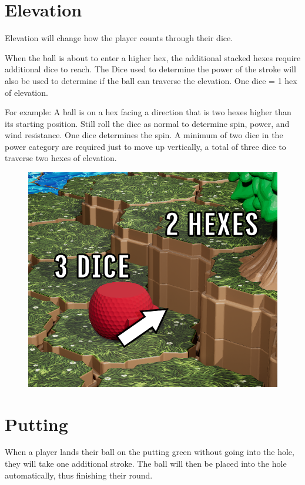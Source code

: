 \documentclass[../main.tex]{subfiles}
\begin{document}
\section{Elevation}
Elevation will change how the player counts through their dice.

When the ball is about to enter a higher hex, the additional stacked hexes require additional dice to reach. The Dice used to determine the power of the stroke will also be used to determine if the ball can traverse the elevation. One dice  = 1 hex of elevation.

For example: A ball is on a hex facing a direction that is two hexes higher than its starting position. Still roll the dice as normal to determine spin, power, and wind resistance. One dice determines the spin. A minimum of two dice in the power category are required just to move up vertically, a total of three dice to traverse two hexes of elevation. 

\begin{figure}[h]
    \centering
    \includegraphics[width=1\linewidth]{chapters//Elevation.Putting.Winning/Source Golf HittingoverElevation.png}
\end{figure}

\section{Putting}

When a player lands their ball on the putting green without going into the hole, they will take one additional stroke. The ball will then be placed into the hole automatically, thus finishing their round. 
\end{document}
